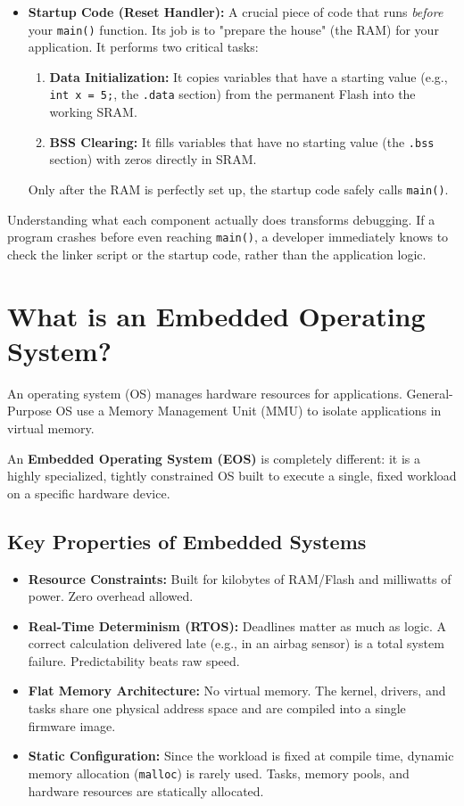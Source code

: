 \begin{itemize}
    \item \textbf{Startup Code (Reset Handler):} A crucial piece of code that runs \textit{before} your \texttt{main()} function. Its job is to "prepare the house" (the RAM) for your application. It performs two critical tasks:
    \begin{enumerate}
        \item \textbf{Data Initialization:} It copies variables that have a starting value (e.g., \texttt{int x = 5;}, the \texttt{.data} section) from the permanent Flash into the working SRAM.
        \item \textbf{BSS Clearing:} It fills variables that have no starting value (the \texttt{.bss} section) with zeros directly in SRAM.
    \end{enumerate}
    Only after the RAM is perfectly set up, the startup code safely calls \texttt{main()}.
\end{itemize}

Understanding what each component actually does transforms debugging. If a program crashes before even reaching \texttt{main()}, a developer immediately knows to check the linker script or the startup code, rather than the application logic.

\section{What is an Embedded Operating System?}
An operating system (OS) manages hardware resources for applications. General-Purpose OS use a Memory Management Unit (MMU) to isolate applications in virtual memory. 

An \textbf{Embedded Operating System (EOS)} is completely different: it is a highly specialized, tightly constrained OS built to execute a single, fixed workload on a specific hardware device.

\subsection{Key Properties of Embedded Systems}
\begin{itemize}
    \item \textbf{Resource Constraints:} Built for kilobytes of RAM/Flash and milliwatts of power. Zero overhead allowed.
    \item \textbf{Real-Time Determinism (RTOS):} Deadlines matter as much as logic. A correct calculation delivered late (e.g., in an airbag sensor) is a total system failure. Predictability beats raw speed.
    \item \textbf{Flat Memory Architecture:} No virtual memory. The kernel, drivers, and tasks share one physical address space and are compiled into a single firmware image.
    \item \textbf{Static Configuration:} Since the workload is fixed at compile time, dynamic memory allocation (\texttt{malloc}) is rarely used. Tasks, memory pools, and hardware resources are statically allocated.
\end{itemize}

